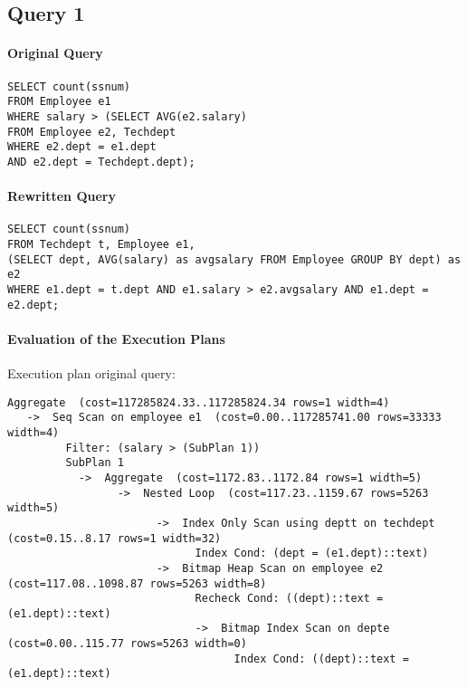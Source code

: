 \documentclass[11pt]{scrartcl}
\begin{document}
\subsection*{Query 1}

\paragraph{Original Query}

{\small
\begin{verbatim}
SELECT count(ssnum)
FROM Employee e1
WHERE salary > (SELECT AVG(e2.salary)
FROM Employee e2, Techdept
WHERE e2.dept = e1.dept
AND e2.dept = Techdept.dept);
\end{verbatim}
}

\paragraph{Rewritten Query}

{\small
\begin{verbatim}
SELECT count(ssnum)
FROM Techdept t, Employee e1, 
(SELECT dept, AVG(salary) as avgsalary FROM Employee GROUP BY dept) as e2
WHERE e1.dept = t.dept AND e1.salary > e2.avgsalary AND e1.dept = e2.dept;
\end{verbatim}
}

\paragraph{Evaluation of the Execution Plans}

Execution plan original query:

\begin{verbatim}
Aggregate  (cost=117285824.33..117285824.34 rows=1 width=4)
   ->  Seq Scan on employee e1  (cost=0.00..117285741.00 rows=33333 width=4)
         Filter: (salary > (SubPlan 1))
         SubPlan 1
           ->  Aggregate  (cost=1172.83..1172.84 rows=1 width=5)
                 ->  Nested Loop  (cost=117.23..1159.67 rows=5263 width=5)
                       ->  Index Only Scan using deptt on techdept  (cost=0.15..8.17 rows=1 width=32)
                             Index Cond: (dept = (e1.dept)::text)
                       ->  Bitmap Heap Scan on employee e2  (cost=117.08..1098.87 rows=5263 width=8)
                             Recheck Cond: ((dept)::text = (e1.dept)::text)
                             ->  Bitmap Index Scan on depte  (cost=0.00..115.77 rows=5263 width=0)
                                   Index Cond: ((dept)::text = (e1.dept)::text)
\end{verbatim}
\end{document}

